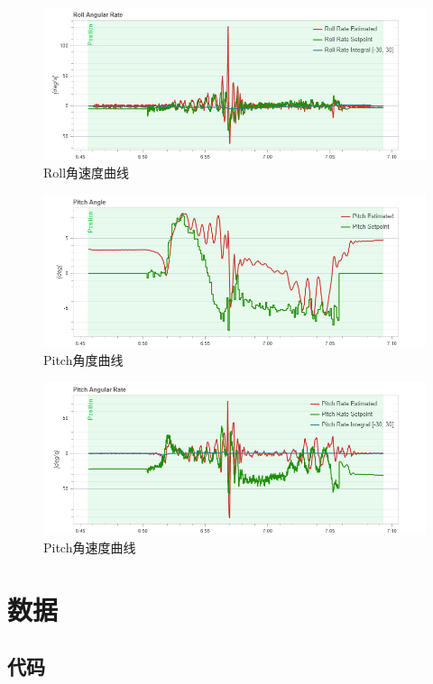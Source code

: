\begin{figure}[H]
    \centering
    \includegraphics[width=0.8\linewidth]{./Figure/Roll_Angular_Plot.png}
    \caption{Roll角速度曲线}\label{Fig:append_img9}
\end{figure}

\begin{figure}[H]
    \centering
    \includegraphics[width=0.8\linewidth]{./Figure/Pitch_Angle_Plot.png}
    \caption{Pitch角度曲线}\label{Fig:append_img10}
\end{figure}

\begin{figure}[H]
    \centering
    \includegraphics[width=0.8\linewidth]{./Figure/Pitch_Angular_Plot.png}
    \caption{Pitch角速度曲线}\label{Fig:append_img11}
\end{figure}

\chapter{数据}

\section{代码}




